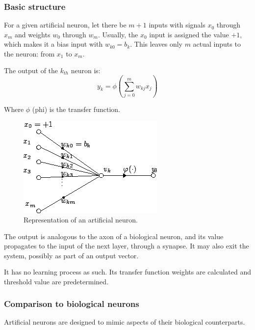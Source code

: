 \documentclass[14pt,a4paper]{extarticle}
\begin{document}
	\subsubsection{Basic structure}
	
	For a given artificial neuron, let there be $m + 1$ inputs with signals $x_{0}$ through $x_{m}$ and weights $w_{0}$ through $w_{m}$. Usually, the $x_{0}$ input is assigned the value $+1$, which makes it a bias input with $w_{k0} = b_{k}$. This leaves only $m$ actual inputs to the neuron: from $x_{1}$ to $x_{m}$.

	The output of the $k_{th}$ neuron is:	
	\begin{equation}
		y_{k} = \phi \left( \sum_{j = 0}^{m}w_{kj}x_{j} \right)
	\end{equation}
	
	Where $\phi$ (phi) is the transfer function.
	
	\begin{figure} [H]
		\includegraphics[scale = 0.9, center]{Artificial_neuron.png}
		\caption{Representation of an artificial neuron.}
	\end{figure}
	
	The output is analogous to the axon of a biological neuron, and its value propagates to the input of the next layer, through a synapse. It may also exit the system, possibly as part of an output vector.

It has no learning process as such. Its transfer function weights are calculated and threshold value are predetermined.


	\subsubsection{Comparison to biological neurons}
	
	Artificial neurons are designed to mimic aspects of their biological counterparts.
	
\end{document}
